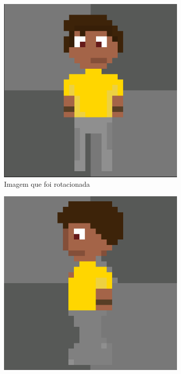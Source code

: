 \begin{figure}[htbp]
    \centering
    \caption{\small Processo da utilização 1 da ferramenta de rotação do PixelLab em julho/2025}
    \label{fig:pixelLabRotacao2}

    \begin{subfigure}{0.32\linewidth}
        \includegraphics[width=1\linewidth]{figs/pixelLab/dia2/sprite_centro.PNG}
        \caption{\small Imagem que foi rotacionada}
        \label{fig:pixelLabRot2a}
    \end{subfigure}
    \begin{subfigure}{0.32\linewidth}
        \includegraphics[width=1\linewidth]{figs/pixelLab/dia2/rot90res1.PNG}

\end{subfigure}
\end{figure}
